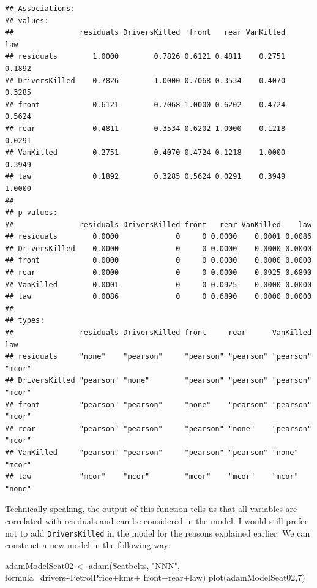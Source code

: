 \documentclass[
]{book}
\newenvironment{Shaded}{\begin{snugshade}}{\end{snugshade}}
\newcommand{\AttributeTok}[1]{\textcolor[rgb]{0.77,0.63,0.00}{#1}}
\newcommand{\DecValTok}[1]{\textcolor[rgb]{0.00,0.00,0.81}{#1}}
\newcommand{\FunctionTok}[1]{\textcolor[rgb]{0.00,0.00,0.00}{#1}}
\newcommand{\NormalTok}[1]{#1}
\newcommand{\OtherTok}[1]{\textcolor[rgb]{0.56,0.35,0.01}{#1}}
\newcommand{\SpecialCharTok}[1]{\textcolor[rgb]{0.00,0.00,0.00}{#1}}
\newcommand{\StringTok}[1]{\textcolor[rgb]{0.31,0.60,0.02}{#1}}
\theoremstyle{definition}
\theoremstyle{definition}
\theoremstyle{definition}
\theoremstyle{definition}
\theoremstyle{remark}
\begin{document}
\begin{verbatim}
## Associations: 
## values:
##               residuals DriversKilled  front   rear VanKilled    law
## residuals        1.0000        0.7826 0.6121 0.4811    0.2751 0.1892
## DriversKilled    0.7826        1.0000 0.7068 0.3534    0.4070 0.3285
## front            0.6121        0.7068 1.0000 0.6202    0.4724 0.5624
## rear             0.4811        0.3534 0.6202 1.0000    0.1218 0.0291
## VanKilled        0.2751        0.4070 0.4724 0.1218    1.0000 0.3949
## law              0.1892        0.3285 0.5624 0.0291    0.3949 1.0000
## 
## p-values:
##               residuals DriversKilled front   rear VanKilled    law
## residuals        0.0000             0     0 0.0000    0.0001 0.0086
## DriversKilled    0.0000             0     0 0.0000    0.0000 0.0000
## front            0.0000             0     0 0.0000    0.0000 0.0000
## rear             0.0000             0     0 0.0000    0.0925 0.6890
## VanKilled        0.0001             0     0 0.0925    0.0000 0.0000
## law              0.0086             0     0 0.6890    0.0000 0.0000
## 
## types:
##               residuals DriversKilled front     rear      VanKilled law   
## residuals     "none"    "pearson"     "pearson" "pearson" "pearson" "mcor"
## DriversKilled "pearson" "none"        "pearson" "pearson" "pearson" "mcor"
## front         "pearson" "pearson"     "none"    "pearson" "pearson" "mcor"
## rear          "pearson" "pearson"     "pearson" "none"    "pearson" "mcor"
## VanKilled     "pearson" "pearson"     "pearson" "pearson" "none"    "mcor"
## law           "mcor"    "mcor"        "mcor"    "mcor"    "mcor"    "none"
\end{verbatim}

Technically speaking, the output of this function tells us that all variables are correlated with residuals and can be considered in the model. I would still prefer not to add \texttt{DriversKilled} in the model for the reasons explained earlier. We can construct a new model in the following way:

\begin{Shaded}
\begin{Highlighting}[]
\NormalTok{adamModelSeat02 }\OtherTok{\textless{}{-}} \FunctionTok{adam}\NormalTok{(Seatbelts, }\StringTok{"NNN"}\NormalTok{,}
                        \AttributeTok{formula=}\NormalTok{drivers}\SpecialCharTok{\textasciitilde{}}\NormalTok{PetrolPrice}\SpecialCharTok{+}\NormalTok{kms}\SpecialCharTok{+}
\NormalTok{                          front}\SpecialCharTok{+}\NormalTok{rear}\SpecialCharTok{+}\NormalTok{law)}
\FunctionTok{plot}\NormalTok{(adamModelSeat02,}\DecValTok{7}\NormalTok{)}
\end{Highlighting}
\end{Shaded}
\end{document}
